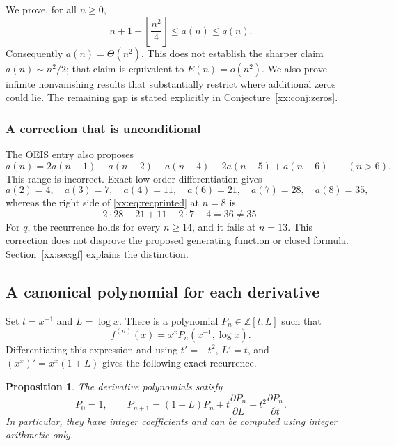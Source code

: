 \documentclass[11pt,a4paper]{article}
\numberwithin{equation}{section}
\newtheorem{proposition}[theorem]{Proposition}
\theoremstyle{definition}
\theoremstyle{remark}
\theoremstyle{plain}
\newcommand{\Z}{\mathbb Z}
\begin{document}
We prove, for all $n\ge0$,
\begin{equation}\label{xx:eq:introbounds}
 n+1+\left\lfloor\frac{n^2}{4}\right\rfloor\le a(n)\le q(n).
\end{equation}
Consequently $a(n)=\Theta(n^2)$. This does not establish the sharper claim
$a(n)\sim n^2/2$; that claim is equivalent to $E(n)=o(n^2)$.
We also prove infinite nonvanishing results that substantially restrict where
additional zeros could lie. The remaining gap is stated explicitly in
Conjecture~\ref{xx:conj:zeros}.

\subsubsection{A correction that is unconditional}
The OEIS entry also proposes
\begin{equation}\label{xx:eq:recprinted}
 a(n)=2a(n-1)-a(n-2)+a(n-4)-2a(n-5)+a(n-6)\qquad(n>6).
\end{equation}
This range is incorrect. Exact low-order differentiation gives
\[
 a(2)=4,\quad a(3)=7,\quad a(4)=11,\quad a(6)=21,\quad
 a(7)=28,\quad a(8)=35,
\]
whereas the right side of \eqref{xx:eq:recprinted} at $n=8$ is
\[
 2\cdot28-21+11-2\cdot7+4=36\ne35.
\]
For $q$, the recurrence holds for every $n\ge14$, and it fails at $n=13$.
This correction does not disprove the proposed generating function or
closed formula. Section~\ref{xx:sec:gf} explains the distinction.

\subsection{A canonical polynomial for each derivative}

Set $t=x^{-1}$ and $L=\log x$. There is a polynomial $P_n\in\Z[t,L]$ such that
\begin{equation}\label{xx:eq:Pdefinition}
 f^{(n)}(x)=x^x P_n(x^{-1},\log x).
\end{equation}
Differentiating this expression and using $t'=-t^2$, $L'=t$, and
$(x^x)'=x^x(1+L)$ gives the following exact recurrence.

\begin{proposition}\label{xx:prop:Prec}
The derivative polynomials satisfy
\begin{equation}\label{xx:eq:Prec}
 P_0=1,\qquad P_{n+1}=(1+L)P_n+t\frac{\partial P_n}{\partial L}
                         -t^2\frac{\partial P_n}{\partial t}.
\end{equation}
In particular, they have integer coefficients and can be computed using
integer arithmetic only.
\end{proposition}
\end{document}
